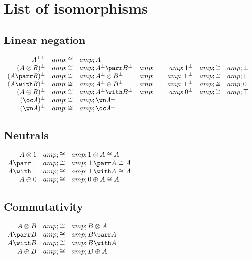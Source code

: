 \section{List of isomorphisms}\label{list-of-isomorphisms}

\subsection{Linear negation}\label{linear-negation-1}

\(\begin{array}{rclcrcl}
  A\biorth &amp;\cong&amp; A\\
  (A\tens B)\orth &amp;\cong&amp; A\orth\parr B\orth &amp;\quad&amp; \one\orth  &amp;\cong&amp; \bot\\
  (A\parr B)\orth &amp;\cong&amp; A\orth\tens B\orth &amp;\quad&amp; \bot\orth  &amp;\cong&amp; \one\\
  (A\with B)\orth &amp;\cong&amp; A\orth\plus B\orth &amp;\quad&amp; \top\orth  &amp;\cong&amp; \zero\\
  (A\plus B)\orth &amp;\cong&amp; A\orth\with B\orth &amp;\quad&amp; \zero\orth &amp;\cong&amp; \top\\
  (\oc A)\orth &amp;\cong&amp; \wn A\orth\\
  (\wn A)\orth &amp;\cong&amp; \oc A\orth\\
\end{array}\)

\subsection{Neutrals}\label{neutrals}

\(\begin{array}{rcl}
  A\tens\one  &amp;\cong&amp; \one\tens A\cong A\\
  A\parr\bot  &amp;\cong&amp; \bot\parr A\cong A\\
  A\with\top  &amp;\cong&amp; \top\with A\cong A\\
  A\plus\zero &amp;\cong&amp;\zero\plus A\cong A\\
\end{array}\)

\subsection{Commutativity}\label{commutativity-1}

\(\begin{array}{rcl}
  A\tens B &amp;\cong&amp; B\tens A\\
  A\parr B &amp;\cong&amp; B\parr A\\
  A\with B &amp;\cong&amp; B\with A\\
  A\plus B &amp;\cong&amp; B\plus A\\
\end{array}\)

